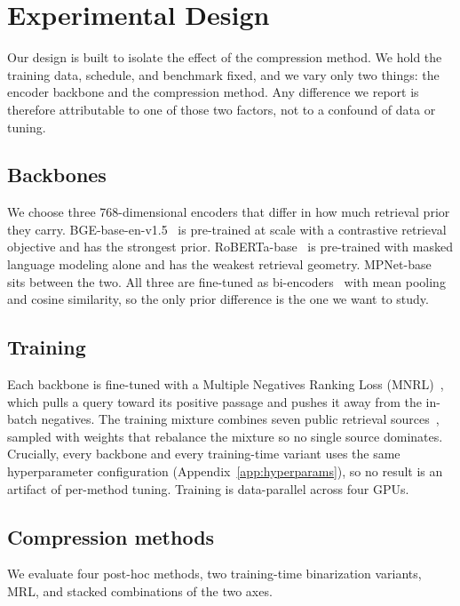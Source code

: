 \section{Experimental Design}
\label{sec:method}

Our design is built to isolate the effect of the compression method. We hold the
training data, schedule, and benchmark fixed, and we vary only two things: the
encoder backbone and the compression method. Any difference we report is
therefore attributable to one of those two factors, not to a confound of data or
tuning.

\subsection{Backbones}
\label{subsec:backbones}
We choose three 768-dimensional encoders that differ in how much retrieval prior
they carry. BGE-base-en-v1.5~\citep{xiao2023c} is pre-trained at scale with a
contrastive retrieval objective and has the strongest prior. RoBERTa-base~\citep{liu2019roberta}
is pre-trained with masked language modeling alone and has the weakest retrieval
geometry. MPNet-base~\citep{song2020mpnet} sits between the two. All three are
fine-tuned as bi-encoders~\citep{reimers2019sbert} with mean pooling and cosine
similarity, so the only prior difference is the one we want to study.

\subsection{Training}
\label{subsec:training}
Each backbone is fine-tuned with a Multiple Negatives Ranking Loss
(MNRL)~\citep{oord2018representation}, which pulls a query toward its positive
passage and pushes it away from the in-batch negatives. The training mixture
combines seven public retrieval sources~\citep{bajaj2016ms, lo2020s2orc,
kwiatkowski2019natural, joshi2017triviaqa, yang2018hotpotqa, gao2021simcse},
sampled with weights that rebalance the mixture so no single source dominates.
Crucially, every backbone and every training-time variant uses the same
hyperparameter configuration (Appendix~\ref{app:hyperparams}), so no result is an
artifact of per-method tuning. Training is data-parallel across four GPUs.

\subsection{Compression methods}
\label{subsec:methods}
We evaluate four post-hoc methods, two training-time binarization variants, MRL,
and stacked combinations of the two axes.

